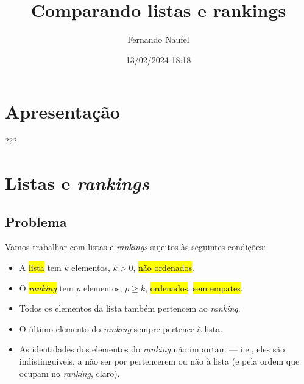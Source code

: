 \documentclass[
  letterpaper,
  DIV=11,
  numbers=noendperiod]{scrreprt}
\title{Comparando listas e rankings}
\author{Fernando Náufel}
\date{13/02/2024 18:18}
\renewcommand*\contentsname{Índice}
\newcommand\contentsname{Índice}
\begin{document}
\maketitle

\makeatletter
{}
{}
{}
\makeatother


\renewcommand*\contentsname{Índice}
{
\hypersetup{linkcolor=}
\setcounter{tocdepth}{2}
\tableofcontents
}

\chapter*{Apresentação}\label{apresentauxe7uxe3o}


???


\chapter{\texorpdfstring{Listas e
\emph{rankings}}{Listas e rankings}}\label{listas-e-rankings}

\section{Problema}\label{problema}

Vamos trabalhar com listas e \emph{rankings} sujeitos às seguintes
condições:

\begin{itemize}
\item
  A {\hl{lista}} tem $k$ elementos, $k > 0$, {\hl{não ordenados}}.
\item
  O {\hl{\emph{ranking}}} tem $p$ elementos, $p \geq k$,
  {\hl{ordenados}}, {\hl{sem empates}}.
\item
  Todos os elementos da lista também pertencem ao \emph{ranking}.
\item
  O último elemento do \emph{ranking} sempre pertence à lista.
\item
  As identidades dos elementos do \emph{ranking} não importam --- i.e.,
  eles são indistinguíveis, a não ser por pertencerem ou não à lista (e
  pela ordem que ocupam no \emph{ranking}, claro).
\end{itemize}
\end{document}
